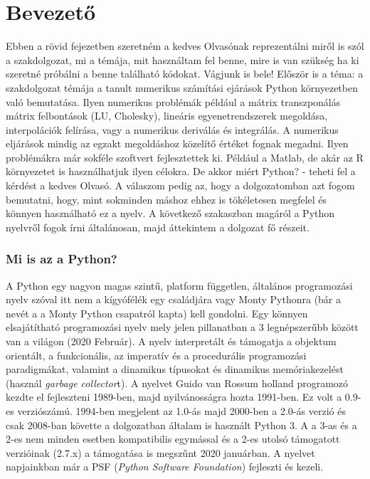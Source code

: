 
\section{Bevezető}\label{bevezetux151}

    Ebben a rövid fejezetben szeretném a kedves Olvasónak reprezentálni
miről is szól a szakdolgozat, mi a témája, mit használtam fel benne,
mire is van szükség ha ki szeretné próbálni a benne található kódokat.
Vágjunk is bele! Először is a téma: a szakdolgozat témája a tanult
numerikus számítási ejárások Python környezetben való bemutatása. Ilyen
numerikus problémák például a mátrix transzponálás mátrix felbontások
(LU, Cholesky), lineáris egyenetrendszerek megoldása, interpolációk
felírása, vagy a numerikus deriválás és integrálás. A numerikus
eljárások mindig az egzakt megoldáshoz közelítő értéket fognak megadni.
Ilyen problémákra már sokféle szoftvert fejlesztettek ki. Például a
Matlab, de akár az R környezetet is használhatjuk ilyen célokra. De
akkor miért Python? - teheti fel a kérdést a kedves Olvasó. A válaszom
pedig az, hogy a dolgozatomban azt fogom bemutatni, hogy, mint sokminden
máshoz ehhez is tökéletesen megfelel és könnyen használható ez a nyelv.
A következő szakaszban magáról a Python nyelvről fogok írni általánosan,
majd áttekintem a dolgozat fő részeit.

    \subsubsection{Mi is az a Python?}\label{mi-is-az-a-python}

    A Python egy nagyon magas szintű, platform független, általános
programozási nyelv szóval itt nem a kígyófélék egy családjára vagy Monty
Pythonra (bár a nevét a a Monty Python csapatról kapta) kell gondolni.
Egy könnyen elsajátítható programozási nyelv mely jelen pillanatban a 3
legnépszerűbb között van a világon (2020 Február). A nyelv interpretált
és támogatja a objektum orientált, a funkcionális, az imperatív és a
procedurális programozási paradigmákat, valamint a dinamikus típusokat
és dinamikus memóriakezelést (használ \emph{garbage collector}t). A
nyelvet Guido van Rossum holland programozó kezdte el fejleszteni
1989-ben, majd nyilvánosságra hozta 1991-ben. Ez volt a 0.9-es
verziószámú. 1994-ben megjelent az 1.0-ás majd 2000-ben a 2.0-ás verzió
és csak 2008-ban követte a dolgozatban általam is használt Python 3. A a
3-as és a 2-es nem minden esetben kompatibilis egymással és a 2-es
utolsó támogatott verzióinak (2.7.x) a támogatása is megszűnt 2020
januárban. A nyelvet napjainkban már a PSF (\emph{Python Software
Foundation}) fejleszti és kezeli.

